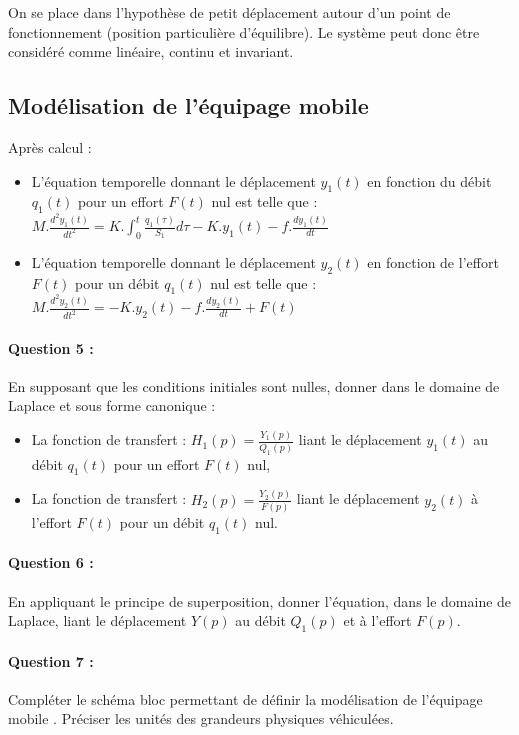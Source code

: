On se place dans l'hypothèse de petit déplacement autour d'un point de fonctionnement (position particulière d'équilibre). Le système peut donc être considéré comme linéaire, continu et invariant.

\subsection{Modélisation de l'équipage mobile}

Après calcul :
\begin{itemize}
 \item L'équation temporelle donnant le déplacement $y_1(t)$ en fonction du débit $q_1(t)$ pour un effort $F(t)$ nul est telle que : 
 $M.\frac{d^2y_1(t)}{dt^2}=K.\int_{0}^{t} \frac{q_1(\tau)}{S_1}d\tau-K.y_1(t)-f.\frac{dy_1(t)}{dt}$
 \item L'équation temporelle donnant le déplacement $y_2(t)$ en fonction de l'effort $F(t)$ pour un débit $q_1(t)$ nul est telle que :
 $M.\frac{d^2y_2(t)}{dt^2}=-K.y_2(t)-f.\frac{dy_2(t)}{dt}+F(t)$
\end{itemize}

\paragraph{Question 5 :} En supposant que les conditions initiales sont nulles, donner dans le domaine de Laplace et sous forme canonique :

\begin{itemize}
 \item La fonction de transfert : $H_1(p)=\frac{Y_1(p)}{Q_1(p)}$ liant le déplacement $y_1(t)$ au débit $q_1(t)$ pour un effort $F(t)$ nul,
 \item La fonction de transfert : $H_2(p)=\frac{Y_2(p)}{F(p)}$ liant le déplacement $y_2(t)$ à l'effort $F(t)$ pour un débit $q_1(t)$ nul.
\end{itemize}
  
\paragraph{Question 6 :} En appliquant le principe de superposition, donner l'équation, dans le domaine de Laplace, liant le déplacement $Y(p)$ au débit $Q_1(p)$ et à l'effort $F(p)$.

\paragraph{Question 7 :} Compléter le schéma bloc permettant de définir la modélisation de l'\og équipage mobile \fg. Préciser les unités des grandeurs physiques véhiculées.


